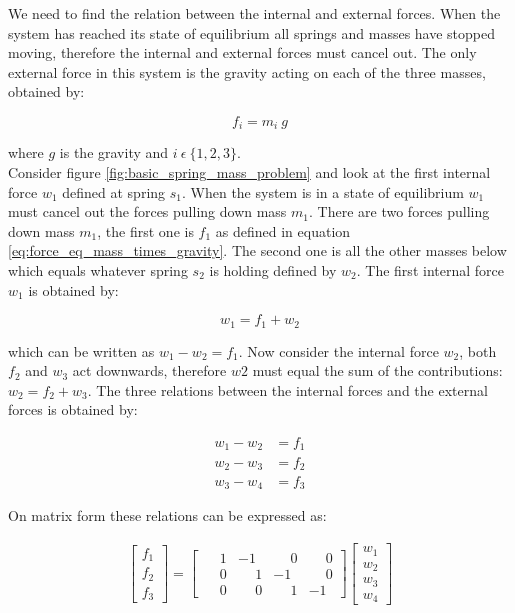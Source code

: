 We need to find the relation between the internal and external
forces. When the system has reached its state of equilibrium all
springs and masses have stopped moving, therefore the internal and external
forces must cancel out. The only external force in this
system is the gravity acting on each of the three masses, obtained by:

\begin{equation}
\label{eq:force_eq_mass_times_gravity}
f_i = m_i \ g
\end{equation}

where $g$ is the gravity and $i \ \epsilon \ \lbrace 1,2,3
\rbrace$.\\

Consider figure \vref{fig:basic_spring_mass_problem} and look at the
first internal force $w_1$ defined at spring $s_1$. When the system is
in a state of equilibrium $w_1$ must cancel out the forces pulling
down mass $m_1$. There are two forces pulling down mass $m_1$, the first
one is $f_1$ as defined in equation
\eqref{eq:force_eq_mass_times_gravity}. The second one is all the 
other masses below which equals whatever spring $s_2$ is
holding defined by $w_2$. The first internal force $w_1$ is obtained by:

\begin{equation}  
\label{eq:w1_equal_e2_times_f1}
w_1 = f_1 + w_2
\end{equation}

which can be written as $w_1 - w_2 = f_1$. Now consider the internal
force $w_2$, both $f_2$ and $w_3$ act downwards, therefore $w2$ must
equal the sum of the contributions: $w_2 = f_2 +w_3$. The three relations
between the internal forces and the external forces is obtained by: 

\begin{align*}
w_1 - w_2 &= f_1 \\
w_2 - w_3 &= f_2 \\
w_3 - w_4 &= f_3
\end{align*}

On matrix form these relations can be expressed as:

\begin{align}
\begin{bmatrix}
f_1 \\ f_2\\ f_3
\end{bmatrix}
=
\begin{bmatrix}
  \phantom{-}1 &           -1 & \phantom{-}0 & \phantom{-}0 \\
  \phantom{-}0 & \phantom{-}1 &           -1 & \phantom{-}0 \\
  \phantom{-}0 & \phantom{-}0 & \phantom{-}1 &           -1 
\end{bmatrix}
\begin{bmatrix}
w_1 \\ w_2 \\ w_3 \\ w_4
\end{bmatrix}
\end{align}

